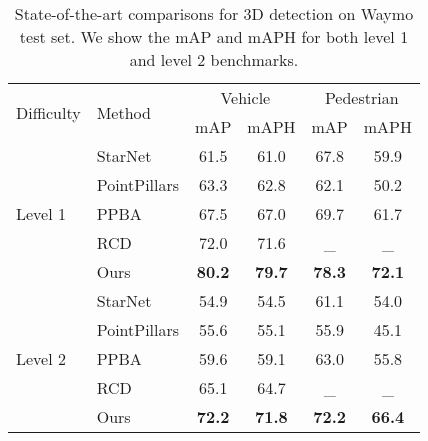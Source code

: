 \documentclass[final]{cvpr}
\begin{document}
{
\begin{table}[t]
\small
\begin{center}
\begin{tabular}{@{}l@{\ \ }l@{\ \ }c@{\ \ }c@{\ \ }c@{\ \ }c@{}}
  \toprule 
   \multirow{2}{4em}{Difficulty} & \multirow{2}{4em}{Method} &  \multicolumn{2}{c}{Vehicle} & \multicolumn{2}{c}{Pedestrian}  \\
   & & mAP & mAPH &  mAP & mAPH \\
    \cmidrule(r){1-2}
    \cmidrule(r){3-4}
    \cmidrule(r){5-6}
    \multirow{5}{3em}{Level 1}
  & StarNet \cite{ngiam2019starnet} & 61.5 & 61.0 & 67.8 & 59.9  \\   
  & PointPillars \cite{pillar} & 63.3 & 62.8 & 62.1 & 50.2   \\  
  & PPBA \cite{ngiam2019starnet} & 67.5 & 67.0 & 69.7 & 61.7   \\   
  & RCD \cite{bewley2020range} & 72.0 & 71.6 & \_ & \_  \\ 
  & Ours & \textbf{80.2} & \textbf{79.7} & \textbf{78.3} & \textbf{72.1} \\
    \cmidrule(r){1-2}
    \cmidrule(r){3-4}
    \cmidrule(r){5-6}
    \multirow{5}{3em}{Level 2}
  & StarNet \cite{ngiam2019starnet} & 54.9 & 54.5 & 61.1 & 54.0   \\   
  & PointPillars \cite{pillar} & 55.6 & 55.1 & 55.9 & 45.1   \\  
  & PPBA \cite{ngiam2019starnet} & 59.6 & 59.1 & 63.0 & 55.8  \\   
  & RCD \cite{bewley2020range} & 65.1 & 64.7 & \_ & \_ \\  
  & Ours & \textbf{72.2} & \textbf{71.8} & \textbf{72.2} & \textbf{66.4}  \\ 

\bottomrule
 \end{tabular}
\end{center}
\vspace{-5mm}
\small
\caption{State-of-the-art comparisons for 3D detection on Waymo test set. We show the mAP and mAPH for both level 1 and level 2 benchmarks.}
\end{table}
}
\end{document}
